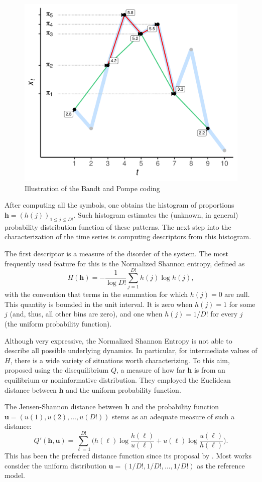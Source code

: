 \documentclass[alpha-refs]{wiley-article}
\begin{document}
\begin{figure}[hbt]
	\centering
	\includegraphics[width=.7\linewidth]{IntroBP}
	\caption{Illustration of the Bandt and Pompe coding}
	\label{Fig:IntroBP}
\end{figure}

After computing all the symbols, one obtains the histogram of proportions $\bm h = (h(j))_{1\leq j\leq D!}$.
Such histogram estimates the (unknown, in general) probability distribution function of these patterns.
The next step into the characterization of the time series is computing descriptors from this histogram.

The first descriptor is a measure of the disorder of the system.
The most frequently used feature for this is the Normalized Shannon entropy, defined as
\begin{equation}
	H(\bm h) = -\frac{1}{\log D!} \sum_{j=1}^{D!} h(j) \log h(j),
\end{equation}
with the convention that terms in the summation for which $h(j)=0$ are null.
This quantity is bounded in the unit interval. 
It is zero when $h(j)=1$ for some $j$ (and, thus, all other bins are zero), and one when $h(j)=1/D!$ for every $j$ (the uniform probability function).

Although very expressive, the Normalized Shannon Entropy is not able to describe all possible underlying dynamics.
In particular, for intermediate values of $H$, there is a wide variety of situations worth characterizing.
To this aim, \citet{LopezRuiz1995} proposed using the disequilibrium  $Q$, a measure of how far $\bm h$ is from an equilibrium or noninformative distribution.
They employed the Euclidean distance between $\bm h$ and the uniform probability function.

The Jensen-Shannon distance between $\bm h$ and the probability function $\bm u=(u(1), u(2), \dots, u(D!))$ stems as an adequate measure of such a distance:
\begin{equation}
	Q'(\bm{h}, \bm{u}) = \sum_{\ell=1}^{D!} \Big(h(\ell) \log\frac{h(\ell)}{u(\ell)} +
	u(\ell) \log\frac{u(\ell)}{h(\ell)}
	\Big).
	\label{eq:JensenShannon}
\end{equation}
This has been the preferred distance function since its proposal by \citet{Lamberti2004}.
Most works consider the uniform distribution $\bm u = (1/D!, 1/D!, \dots, 1/D!)$ as the reference model.
\end{document}
